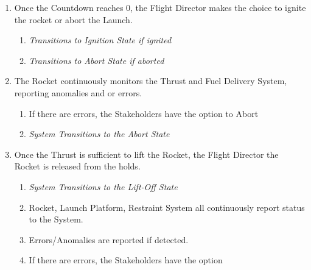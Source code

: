\documentclass[letterpaper]{article}
\begin{document}
\begin{enumerate}
\begin{enumerate}
\begin{enumerate}
                  fix without aborting the Countdown, then the 
                  Countdown is aborted
                  \begin{enumerate}
                     \item \textit{The System Transitions to the Abort
                        State}
                  \end{enumerate}
               \item If the errors are fixed, the countdown continues
                  \begin{enumerate}
                     \item \textit{The System Transitions back to the
                        Countdown State and appropriate Substate}
                  \end{enumerate}
            \end{enumerate}
      \end{enumerate}
   \item Once the Countdown reaches 0, the Flight Director makes the 
      choice to ignite the rocket or abort the Launch.
      \begin{enumerate}
         \item \textit{Transitions to Ignition State if ignited}
         \item \textit{Transitions to Abort State if aborted}
      \end{enumerate}
   \item The Rocket continuously monitors the Thrust and Fuel Delivery
      System, reporting anomalies and or errors.
      \begin{enumerate}
         \item If there are errors, the Stakeholders have the option
            to Abort
         \item \textit{System Transitions to the Abort State}
      \end{enumerate}
   \item Once the Thrust is sufficient to lift the Rocket, the Flight
      Director the Rocket is released from the holds.
      \begin{enumerate}
         \item \textit{System Transitions to the Lift-Off State}
         \item Rocket, Launch Platform, Restraint System all 
            continuously report status to the System.
         \item Errors/Anomalies are reported if detected.
         \item  If there are errors, the Stakeholders have the option

\end{enumerate}
\end{enumerate}
\end{document}
